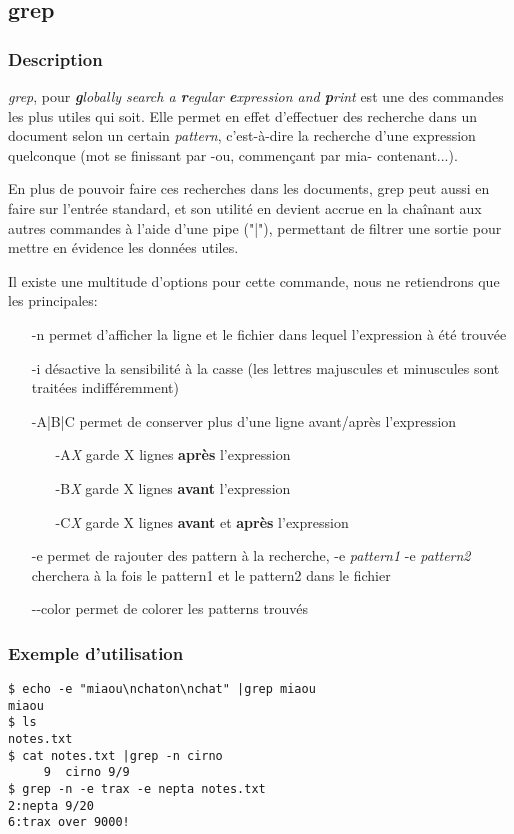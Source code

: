 \subsection*{grep}
\subsubsection*{Description}
\emph{grep}, pour \emph{\textbf{g}lobally search a \textbf{r}egular \textbf{e}xpression and \textbf{p}rint} est une des commandes les plus utiles qui soit.
Elle permet en effet d'effectuer des recherche dans un document selon un certain \emph{pattern}, c'est-à-dire la recherche d'une expression quelconque (mot se finissant par -ou, commençant par mia- contenant...).

En plus de pouvoir faire ces recherches dans les documents, grep peut aussi en faire sur l'entrée standard, et son utilité en devient accrue en la chaînant aux autres commandes à l'aide d'une pipe ("|"), permettant de filtrer une sortie pour mettre en évidence les données utiles.

Il existe une multitude d'options pour cette commande, nous ne retiendrons que les principales:
\begin{itemize}
\item[-n] permet d'afficher la ligne et le fichier dans lequel l'expression à été trouvée
\item[-i] désactive la sensibilité à la casse (les lettres majuscules et minuscules sont traitées indifféremment)
\item[-A|B|C] permet de conserver plus d'une ligne avant/après l'expression
	\begin{itemize}
		\item[-A\emph{X}] garde X lignes \textbf{après} l'expression
		\item[-B\emph{X}] garde X lignes \textbf{avant} l'expression
		\item[-C\emph{X}] garde X lignes \textbf{avant} et \textbf{après} l'expression
	\end{itemize}
\item[-e] permet de rajouter des pattern à la recherche, -e \emph{pattern1} -e \emph{pattern2} cherchera à la fois le pattern1 et le pattern2 dans le fichier
\item[-{}-color] permet de colorer les patterns trouvés
\end{itemize}

\subsubsection*{Exemple d'utilisation}

\begin{lstlisting}
$ echo -e "miaou\nchaton\nchat" |grep miaou
miaou
$ ls
notes.txt
$ cat notes.txt |grep -n cirno
     9  cirno 9/9
$ grep -n -e trax -e nepta notes.txt
2:nepta 9/20
6:trax over 9000!
\end{lstlisting}
